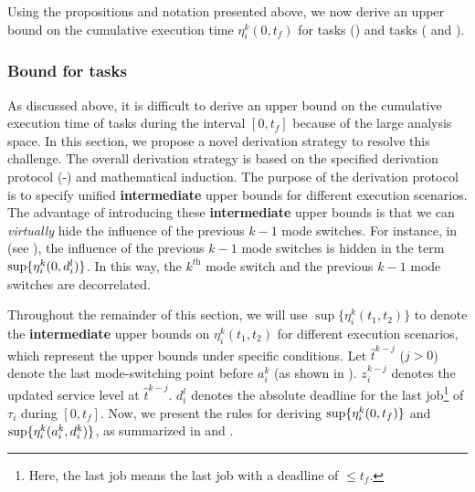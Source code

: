 \documentclass[10pt,journal,compsoc]{IEEEtran}
\begin{document}
Using the propositions and notation presented above, we now derive an upper bound on the cumulative execution time $\eta_i^k(0,t_f)$ for \lo tasks () and \hi tasks ( and ).

\subsubsection{\textbf{Bound for \lo tasks}}
As discussed above, it is difficult to derive an upper bound on the cumulative execution time of \lo tasks during the interval $[0,t_f]$ because of the large analysis space. In this section, we propose a novel derivation strategy to resolve this challenge. The overall derivation strategy is based on the specified derivation protocol (-) and mathematical induction. The purpose of the derivation protocol is to specify unified \textbf{intermediate} upper bounds for different execution scenarios. The advantage of introducing these \textbf{intermediate} upper bounds is that we can \textit{virtually} hide the influence of the previous $k-1$ mode switches. For instance, in  (see ), the influence of the previous $k-1$ mode switches is hidden in the term $\sup\{\eta_i^k(0,d_i^{l})\}$. In this way, the $k^{\textit{th}}$ mode switch and the previous $k-1$ mode switches are decorrelated.  


Throughout the remainder of this section, we will use $\sup{\{\eta_i^k(t_1,t_2)\}}$ to denote the \textbf{intermediate} upper bounds on $\eta_i^k(t_1, t_2)$ for different execution scenarios, which represent the upper bounds under specific conditions. Let $\hat{t}^{k-j}$ ($j>0$) denote the last mode-switching point before $a_i^k$ (as shown in ). $z_i^{k-j}$ denotes the updated service level at $\hat{t}^{k-j}$. $d_i^{l}$ denotes the absolute deadline for the last job\footnote{Here, the last job means the last job with a deadline of $\leq{t_f}$.} of $\tau_i$ during $[0,t_f]$. Now, we present the rules for deriving $\sup\{\eta_i^k(0,t_f)\}$ and $\sup\{\eta_i^k(a_i^k,d_i^{k})\}$, as summarized in  and .
\end{document}
